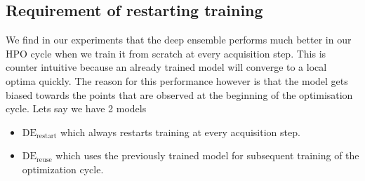 \documentclass[11pt]{report}
\begin{document}
\subsection{Requirement of restarting training}\label{sec:restart}
We find in our experiments that the deep ensemble performs much better in our HPO cycle when we train it from scratch at every acquisition step.
This is counter intuitive because an already trained model will converge to a local optima quickly.
The reason for this performance however is that the model gets biased towards the points that are observed at the beginning of the optimisation cycle.
Lets say we have 2 models 
\begin{itemize}
\item $\textrm{DE}_{\textrm{restart}}$ which always restarts training at every acquisition step.
\item $\textrm{DE}_{\textrm{reuse}}$ which uses the previously trained model for subsequent training of the optimization cycle.
\end{itemize}
\end{document}
